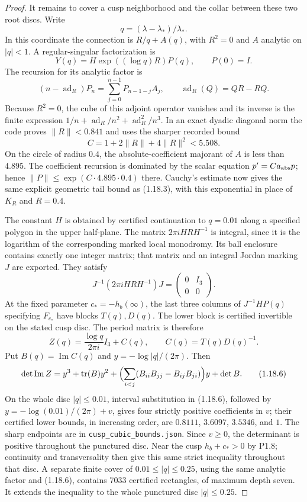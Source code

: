 \begin{proof}
It remains to cover a cusp neighborhood and the collar between these
two root discs.  Write
\[
 q=(\lambda-\lambda_*)/\lambda_*.
\]
In this coordinate the connection is $R/q+A(q)$, with $R^2=0$
and $A$ analytic on $|q|<1$.  A regular-singular factorization is
\[
 Y(q)=H\exp((\log q)R)P(q),\qquad P(0)=I.
\]
The recursion for its analytic factor is
\[
 (n-\operatorname{ad}_R)P_n
   =\sum_{j=0}^{n-1}P_{n-1-j}A_j,
 \qquad \operatorname{ad}_R(Q)=QR-RQ.
\]
Because $R^2=0$, the cube of this adjoint operator vanishes and its
inverse is the finite expression
$1/n+\operatorname{ad}_R/n^2+\operatorname{ad}_R^2/n^3$.
In an exact dyadic diagonal norm the code proves
$\|R\|<0.841$ and uses the sharper recorded bound
\[
 C=1+2\|R\|+4\|R\|^2<5.508.
\]
On the circle of radius $0.4$, the absolute-coefficient majorant of
$A$ is less than $4.895$.  The coefficient recursion is dominated
by the scalar equation $p'=Ca_{\rm abs}p$; hence
$\|P\|\leq\exp(C\cdot4.895\cdot0.4)$ there.  Cauchy's estimate
now gives the same explicit geometric tail bound as (1.18.3), with
this exponential in place of $K_R$ and $R=0.4$.

The constant $H$ is obtained by certified continuation to $q=0.01$
along a specified polygon in the upper half-plane.  The matrix
$2\pi iHRH^{-1}$ is integral, since it is the logarithm of the
corresponding marked local monodromy.  Its ball enclosure contains
exactly one integer matrix; that matrix and an integral Jordan
marking $J$ are exported.  They satisfy
\[
 J^{-1}(2\pi iHRH^{-1})J=\begin{pmatrix}0&I_3\\0&0\end{pmatrix}.
\]
At the fixed parameter $c_*=-h_b(\infty)$, the last three columns of
$J^{-1}HP(q)$ specifying $F_{c_*}$ have blocks $T(q),D(q)$.
The lower block is certified invertible on the stated cusp disc.
The period matrix is therefore
\[
 Z(q)=\frac{\log q}{2\pi i}I_3+C(q),\qquad C(q)=T(q)D(q)^{-1}.
\]
Put $B(q)=\operatorname{Im}C(q)$ and $y=-\log|q|/(2\pi)$.
Then
\[
 \det\operatorname{Im}Z
 =y^3+\operatorname{tr}(B)y^2
   +\Bigl(\sum_{i<j}(B_{ii}B_{jj}-B_{ij}B_{ji})\Bigr)y+\det B.
\tag{1.18.6}
\]
On the whole disc $|q|\leq0.01$, interval substitution in (1.18.6),
followed by $y=-\log(0.01)/(2\pi)+v$, gives four strictly positive
coefficients in $v$; their certified lower bounds, in increasing
order, are $0.8111$, $3.6097$, $3.5346$, and $1$.
The sharp endpoints are in \texttt{cusp\_cubic\_bounds.json}.
Since $v\geq0$, the determinant is positive
throughout the punctured disc.  Near the cusp $h_b+c_*>0$ by P1.8;
continuity and transversality then give this same strict inequality
throughout that disc.  A separate finite cover of
$0.01\leq|q|\leq0.25$, using the same analytic factor and (1.18.6),
contains 7033 certified rectangles, of maximum depth seven.  It
extends the inequality to the whole punctured disc $|q|\leq0.25$.


\end{proof}
